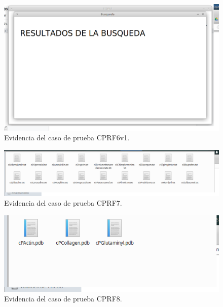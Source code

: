 \begin{figure}[H]
    \centering
    \includegraphics[scale=0.45]{Anexo/imagenes/Imagenes_Pruebas/CPRF6v1.png}
    \caption{Evidencia del caso de prueba CPRF6v1.}
    \label{CPRF6v1}
\end{figure}

\begin{figure}[H]
    \centering
    \includegraphics[scale=0.48]{Anexo/imagenes/Imagenes_Pruebas/CPRF7.png}
    \caption{Evidencia del caso de prueba CPRF7.}
    \label{CPRF7}
\end{figure}

\begin{figure}[H]
    \centering
    \includegraphics[scale=0.85]{Anexo/imagenes/Imagenes_Pruebas/CPRF8.png}
    \caption{Evidencia del caso de prueba CPRF8.}
    \label{CPRF8}
\end{figure}


